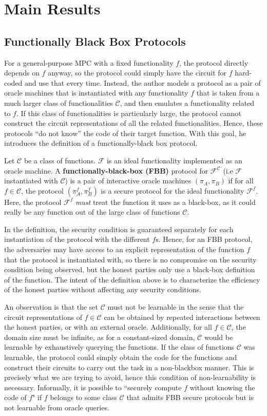 \documentclass[11pt]{article}
\theoremstyle{theorem}
\theoremstyle{theorem}
\theoremstyle{remark}
\theoremstyle{note}
\theoremstyle{plain}
\theoremstyle{definition}
\begin{document}
\section{Main Results}
\subsection{Functionally Black Box Protocols}
For a general-purpose MPC with a fixed functionality $f$, the protocol directly depends on $f$ anyway, so the protocol could simply have the circuit for $f$ hard-coded and use that every time. Instead, the author models a protocol as a pair of oracle machines that is instantiated with any functionality $f$ that is taken from a much larger class of functionalities $\mathcal{C}$, and then emulates a functionality related to $f$. If this class of functionalities is particularly large, the protocol cannot construct the circuit representations of all the related functionalities. Hence, these protocols ``do not know'' the code of their target function. With this goal, he introduces the definition of a functionally-black box protocol.

Let $\mathcal{C}$ be a class of functions. $\mathcal{F}$ is an ideal functionality implemented as an oracle machine. A \textbf{functionally-black-box (FBB)} protocol for $\mathcal{F}^\mathcal{C}$ (i.e  $\mathcal{F}$ instantiated with $\mathcal{C}$) is a pair of interactive oracle machines $(\pi_A, \pi_B)$  if for all $f \in \mathcal{C}$, the protocol $(\pi^f_A, \pi^f_B)$ is a secure protocol for the ideal functionality $\mathcal{F}^f$. Here, the protocol $\mathcal{F}^f$ \textit{must} treat the function it uses as a black-box, as it could really be any function out of the large class of functions $\mathcal{C}$. 

In the definition, the security condition is guaranteed separately for each instantiation of the protocol with the different $f$s. Hence, for an FBB protocol, the adversaries may have access to an explicit representation of the function $f$ that the protocol is instantiated with, so there is no compromise on the security condition being observed, but the honest parties only use a black-box definition of the function. The intent of the definition above is to characterize the efficiency of the honest parties without affecting any security conditions.

An observation is that the set $\mathcal{C}$ must not be learnable in the sense that the circuit representations of  $f \in \mathcal{C}$ can be obtained by repeated interactions between the honest parties, or with an external oracle. Additionally, for all $f \in \mathcal{C}$, the domain size must be infinite, as for a constant-sized domain, $\mathcal{C}$ would be learnable by exhaustively querying the functions. If the class of functions $\mathcal{C}$ was learnable, the protocol could simply obtain the code for the functions and construct their circuits to carry out the task in a non-blackbox manner. This is precisely what we are trying to avoid, hence this condition of non-learnability is necessary. Informally, it is possible to ``securely compute $f$ without knowing the code of $f$" if $f$ belongs to some class $\mathcal{C}$ that admits FBB secure protocols but is not learnable from oracle queries.
\end{document}
